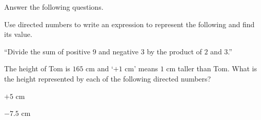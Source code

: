  Answer the following questions.

\begin{subparts}
  \item Use directed numbers to write an expression to represent the following and find its value.

  ``Divide the sum of positive $9$ and negative $3$ by the product of $2$ and $3$.''
  \item The height of Tom is $165$ cm and `$+1$ cm' means $1$ cm taller than Tom. What is the height represented by each of the following directed numbers?
  \begin{subpartsii}[1]
    \item $+5$ cm
    \item $-7.5$ cm
  \end{subpartsii}
\end{subparts}

